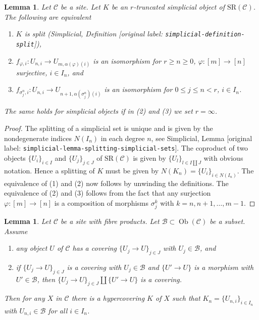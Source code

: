 \documentclass[10pt,a4paper]{article}
\theoremstyle{plain}
\newtheorem{lemma}[subsection]{Lemma}
\theoremstyle{definition}
\theoremstyle{remark}
\numberwithin{equation}{subsection}
\def\Ob{\mathop{\mathrm{Ob}}\nolimits}
\begin{document}
\begin{lemma}
\label{lemma-split}
Let $\mathcal{C}$ be a site. Let $K$ be an $r$-truncated simplicial object
of $\text{SR}(\mathcal{C})$. The following are equivalent
\begin{enumerate}
\item $K$ is split (Simplicial, Definition \textnormal{[original label: \nolinkurl{simplicial-definition-split}]}),
\item $f_{\varphi, i} : U_{n, i} \to U_{m, \alpha(\varphi)(i)}$
is an isomorphism for $r \geq n \geq 0$,
$\varphi : [m] \to [n]$ surjective, $i \in I_n$, and
\item $f_{\sigma^n_j, i} : U_{n, i} \to U_{n + 1, \alpha(\sigma^n_j)(i)}$
is an isomorphism for $0 \leq j \leq n < r$, $i \in I_n$.
\end{enumerate}
The same holds for simplicial objects if in (2) and (3)
we set $r = \infty$.
\end{lemma}

\begin{proof}
The splitting of a simplicial set is unique and is given by
the nondegenerate indices $N(I_n)$ in each degree $n$, see
Simplicial, Lemma \textnormal{[original label: \nolinkurl{simplicial-lemma-splitting-simplicial-sets}]}.
The coproduct of two objects $\{U_i\}_{i \in I}$ and $\{U_j\}_{j \in J}$
of $\text{SR}(\mathcal{C})$ is given by $\{U_l\}_{l \in I \amalg J}$
with obvious notation. Hence a splitting of $K$ must be given by
$N(K_n) = \{U_i\}_{i \in N(I_n)}$. The equivalence of (1) and (2)
now follows by unwinding the definitions. The equivalence of (2)
and (3) follows from the fact that any surjection
$\varphi : [m] \to [n]$ is a composition of morphisms
$\sigma^k_j$ with $k = n, n + 1, \ldots, m - 1$.
\end{proof}


\begin{lemma}
\label{lemma-hypercovering-object}
Let $\mathcal{C}$ be a site with fibre products.
Let $\mathcal{B} \subset \Ob(\mathcal{C})$ be a subset.
Assume
\begin{enumerate}
\item any object $U$ of $\mathcal{C}$ has a covering
$\{U_j \to U\}_{j \in J}$ with $U_j \in \mathcal{B}$, and
\item if $\{U_j \to U\}_{j \in J}$ is a covering
with $U_j \in \mathcal{B}$ and $\{U' \to U\}$ is a morphism with
$U' \in \mathcal{B}$, then $\{U_j \to U\}_{j \in J} \amalg \{U' \to U\}$
is a covering.
\end{enumerate}
Then for any $X$ in $\mathcal{C}$ there is a hypercovering $K$
of $X$ such that $K_n = \{U_{n, i}\}_{i \in I_n}$
with $U_{n, i} \in \mathcal{B}$ for all $i \in I_n$.
\end{lemma}
\end{document}

